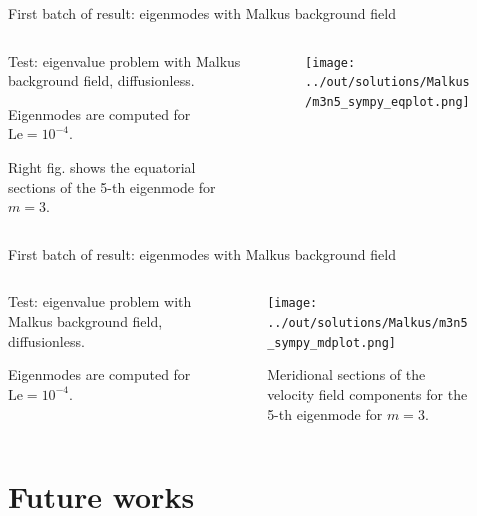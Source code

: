 \documentclass[11pt,aspectratio=169]{beamer}
\begin{document}
\begin{frame}{First batch of result: eigenmodes with Malkus background field}
	\begin{columns}
		\begin{column}{.32\linewidth}
			Test: eigenvalue problem with Malkus background field, diffusionless.
			\vspace{1em}
	
			Eigenmodes are computed for $\mathrm{Le}=10^{-4}$.

			Right fig. shows the equatorial sections of the 5-th eigenmode for $m=3$.
		\end{column}
		\begin{column}{.6\linewidth}
			\begin{figure}
				\centering
				\texttt{[image: ../out/solutions/Malkus/m3n5\_sympy\_eqplot.png]}
			\end{figure}
		\end{column}
	\end{columns}
\end{frame}

\begin{frame}{First batch of result: eigenmodes with Malkus background field}
	\begin{columns}
		\begin{column}{.32\linewidth}
			Test: eigenvalue problem with Malkus background field, diffusionless.
			\vspace{1em}
	
			Eigenmodes are computed for $\mathrm{Le}=10^{-4}$.
		\end{column}
		\begin{column}{.6\linewidth}
			\begin{figure}
				\centering
				\texttt{[image: ../out/solutions/Malkus/m3n5\_sympy\_mdplot.png]}
				\caption{Meridional sections of the velocity field components for the 5-th eigenmode for $m=3$.}
			\end{figure}
		\end{column}
	\end{columns}
\end{frame}

\section{Future works}
\end{document}
